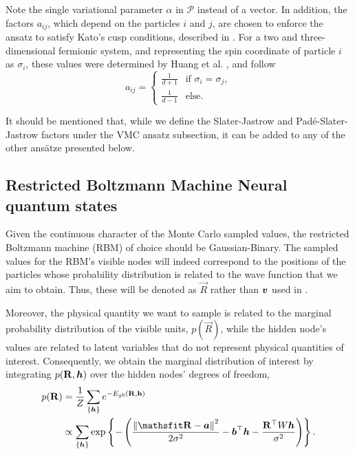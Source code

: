 Note the single variational parameter $\alpha$ in $\mathcal{P}$ instead of a vector. In addition, the factors $a_{ij}$, which depend on the particles $i$ and $j$, are chosen to enforce the ansatz to satisfy Kato's cusp conditions, described in . For a two and three-dimensional fermionic system, and representing the spin coordinate of particle $i$ as $\sigma_i$, these values were determined by Huang et al. \cite{huang1998spin}, and follow
\begin{equation*}
a_{ij} = \begin{cases} 
\frac{1}{d + 1} & \text{if } \sigma_i =  \sigma_j, \\
\frac{1}{d - 1} & \text{else}.
\end{cases}
\end{equation*}

It should be mentioned that, while we define the Slater-Jastrow and Padé-Slater-Jastrow factors under the VMC ansatz subsection, it can be added to any of the other ansätze presented below. 

\subsection{Restricted Boltzmann Machine Neural quantum states}\label{sec:rbm_nqs}

Given the continuous character of the Monte Carlo sampled values, the restricted Boltzmann machine (RBM) of choice should be Gaussian-Binary. The sampled values for the RBM's visible nodes will indeed correspond to the positions of the particles whose probability distribution is related to the wave function that we aim to obtain. Thus, these will be denoted as $\vec{R}$ rather than $\boldsymbol{v}$ used in .

Moreover, the physical quantity we want to sample is related to the marginal probability distribution of the visible units, $p(\Vec{R})$, while the hidden node's values are related to latent variables that do not represent physical quantities of interest. Consequently, we obtain the marginal distribution of interest by integrating $p(\Vec{R}, \mvec{h})$ over the hidden nodes' degrees of freedom,
\begin{align}
    p(\vec{R}) &= \frac{1}{Z}\sum_{\{\mvec{h}\}} e^{-E_{gb}(\vec{R}, \mathbf{h})} \notag \\
                &\propto\sum_{\{\mvec{h}\}} \exp\left\{-\left(\frac{\norm{\mathbf{R} - \mvec{a}}^2}{2\sigma^2}-\mvec{b}^\top\mvec{h} - \frac{\mathbf{R}^\top W\mvec{h}}{\sigma^2}\right)\right\}.  
        \label{eq:marginal}
\end{align}

